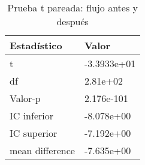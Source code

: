 \begin{table}[ht]
\centering
\caption{Prueba t pareada: flujo antes y después} 
\label{tab:prueba_t_flujo}
\begin{tabular}{ll}
  \hline
Estadístico & Valor \\ 
  \hline
t & -3.3933e+01 \\ 
  df & 2.81e+02 \\ 
  Valor-p & 2.176e-101 \\ 
  IC inferior & -8.078e+00 \\ 
  IC superior & -7.192e+00 \\ 
  mean difference & -7.635e+00 \\ 
   \hline
\end{tabular}
\end{table}
